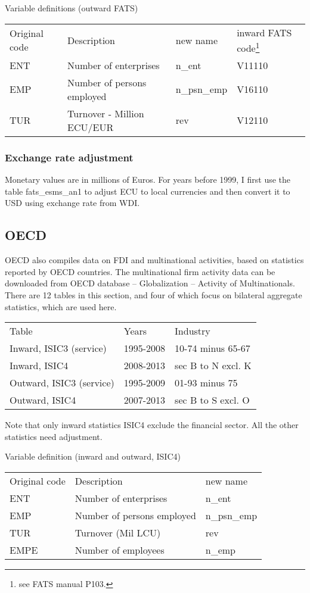 \documentclass[notitlepage,11pt]{article}%
\begin{document}
Variable definitions (outward FATS)%

\begin{tabular}
[c]{llll}%
Original code & Description & new name & inward FATS code\footnote{see FATS
manual P103.}\\
ENT & Number of enterprises & n\_ent & V11110\\
EMP & Number of persons employed & n\_psn\_emp & V16110\\
TUR & Turnover - Million ECU/EUR & rev & V12110
\end{tabular}


\subsubsection{Exchange rate adjustment}

Monetary values are in millions of Euros. For years before 1999, I first use
the table fats\_esms\_an1 to adjust ECU to local currencies and then convert
it to USD using exchange rate from WDI.

\subsection{OECD}

OECD also compiles data on FDI and multinational activities, based on
statistics reported by OECD countries. The multinational firm activity data
can be downloaded from OECD database -- Globalization -- Activity of
Multinationals. There are 12 tables in this section, and four of which focus
on bilateral aggregate statistics, which are used here.%

\begin{tabular}
[c]{lll}%
Table & Years & Industry\\
Inward, ISIC3 (service) & 1995-2008 & 10-74 minus 65-67\\
Inward, ISIC4 & 2008-2013 & sec B to N excl. K\\
Outward, ISIC3 (service) & 1995-2009 & 01-93 minus 75\\
Outward, ISIC4 & 2007-2013 & sec B to S excl. O
\end{tabular}


Note that only inward statistics ISIC4 exclude the financial sector. All the
other statistics need adjustment.

Variable definition (inward and outward, ISIC4)%

\begin{tabular}
[c]{lll}%
Original code & Description & new name\\
ENT & Number of enterprises & n\_ent\\
EMP & Number of persons employed & n\_psn\_emp\\
TUR & Turnover (Mil LCU) & rev\\
EMPE & Number of employees & n\_emp
\end{tabular}
\end{document}
